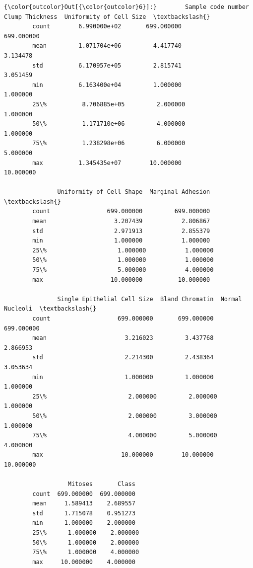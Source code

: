 \documentclass[11pt]{article}
\begin{document}
\begin{Verbatim}[commandchars=\\\{\}]
{\color{outcolor}Out[{\color{outcolor}6}]:}        Sample code number  Clump Thickness  Uniformity of Cell Size  \textbackslash{}
        count        6.990000e+02       699.000000               699.000000   
        mean         1.071704e+06         4.417740                 3.134478   
        std          6.170957e+05         2.815741                 3.051459   
        min          6.163400e+04         1.000000                 1.000000   
        25\%          8.706885e+05         2.000000                 1.000000   
        50\%          1.171710e+06         4.000000                 1.000000   
        75\%          1.238298e+06         6.000000                 5.000000   
        max          1.345435e+07        10.000000                10.000000   
        
               Uniformity of Cell Shape  Marginal Adhesion  \textbackslash{}
        count                699.000000         699.000000   
        mean                   3.207439           2.806867   
        std                    2.971913           2.855379   
        min                    1.000000           1.000000   
        25\%                    1.000000           1.000000   
        50\%                    1.000000           1.000000   
        75\%                    5.000000           4.000000   
        max                   10.000000          10.000000   
        
               Single Epithelial Cell Size  Bland Chromatin  Normal Nucleoli  \textbackslash{}
        count                   699.000000       699.000000       699.000000   
        mean                      3.216023         3.437768         2.866953   
        std                       2.214300         2.438364         3.053634   
        min                       1.000000         1.000000         1.000000   
        25\%                       2.000000         2.000000         1.000000   
        50\%                       2.000000         3.000000         1.000000   
        75\%                       4.000000         5.000000         4.000000   
        max                      10.000000        10.000000        10.000000   
        
                  Mitoses       Class  
        count  699.000000  699.000000  
        mean     1.589413    2.689557  
        std      1.715078    0.951273  
        min      1.000000    2.000000  
        25\%      1.000000    2.000000  
        50\%      1.000000    2.000000  
        75\%      1.000000    4.000000  
        max     10.000000    4.000000  
\end{Verbatim}
            
\end{document}
